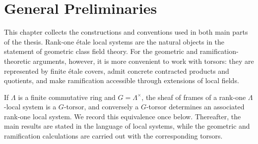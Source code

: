 \chapter{General Preliminaries}\label{chapter:general_preliminaries}

This chapter collects the constructions and conventions used in both main parts of
the thesis. Rank-one \'etale local systems are the natural objects in the statement
of geometric class field theory. For the geometric and ramification-theoretic
arguments, however, it is more convenient to work with torsors: they are represented
by finite \'etale covers, admit concrete contracted products and quotients, and make
ramification accessible through extensions of local fields. 

If \(\Lambda\) is a finite commutative ring and \(G=\Lambda^\times\), the sheaf of
frames of a rank-one \(\Lambda\)-local system is a \(G\)-torsor, and conversely a
\(G\)-torsor determines an associated rank-one local system. 
We record this equivalence once below. Thereafter, the main results are stated in
the language of local systems, while the geometric and ramification calculations
are carried out with the corresponding torsors.








